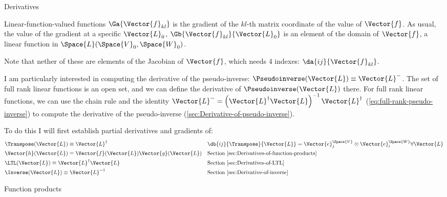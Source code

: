 \begin{plSection}{Derivatives}
\begin{plSection}{Linear-function-valued functions}
$\Ga{\Vector{f}_{kl}}$ is the gradient of the $kl$-th matrix coordinate of the value of $\Vector{f}$.
As usual, the value of the gradient at a specific $\Vector{L}_0$,
$\Gb{\Vector{f}_{kl}}{\Vector{L}_0}$ is an element of the domain of $\Vector{f}$,
a linear function in $\Space{L}(\Space{V}_0,\Space{W}_0)$.

Note that nether of these are elements of the Jacobian of $\Vector{f}$,
which needs 4 indexes: $\da{ij}{\Vector{f}_{kl}}$.

I am particularly interested in computing the derivative of the
pseudo-inverse: $\Pseudoinverse(\Vector{L}) \equiv \Vector{L}^{-}$.
The set of full rank linear functions is an open set,
and we can define the derivative of $\Pseudoinverse(\Vector{L})$ there.
For full rank linear functions,
we can use the chain rule and the identity
$\Vector{L}^{-} = \left( \Vector{L}^{\dagger} \Vector{L} \right)^{-1} \Vector{L}^{\dagger}$
(\cref{eq:full-rank-pseudo-inverse})
to compute the derivative of the pseudo-inverse
(\cref{sec:Derivative-of-pseudo-inverse}).

To do this I will first establish partial derivatives and gradients of:
\begin{equation}
\begin{aligned}
\label{eq:transpose-derivative}
&\Transpose(\Vector{L}) \equiv \Vector{L}^{\dagger}
&&\db{ij}{\Transpose}{\Vector{L}} =  \Vector{e}_j^{\Space{V}} \otimes \Vector{e}_i^{\Space{W}}
\forall \Vector{L}
\\
&\Vector{h}( \Vector{L} ) = \Vector{f} ( \Vector{L} ) \Vector{g} ( \Vector{L} )
&&\text{Section~\ref{sec:Derivatives-of-function-products} }
\\
&\LTL(\Vector{L}) \equiv \Vector{L}^{\dagger} \Vector{L}
&&\text{Section~\ref{sec:Derivatives-of-LTL} }
\\
&\Inverse(\Vector{L}) \equiv \Vector{L}^{-1}
&&\text{Section~\ref{sec:Derivative-of-inverse} }
\end{aligned}
\end{equation}

\begin{plSection}{Function products}
\label{sec:Derivatives-of-function-products}


\end{plSection}
\end{plSection}
\end{plSection}
